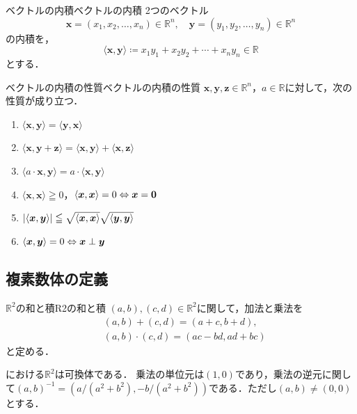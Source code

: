 \begin{definition}{ベクトルの内積}{ベクトルの内積}
  2つのベクトル
  \[
    \bm{x} = (x_1,x_2,\ldots,x_n) \in \mathbb{R}^n,\quad \bm{y} = (y_1,y_2,\ldots,y_n) \in \mathbb{R}^n
  \]
  の内積を，
  \[
    \langle \bm{x} , \bm{y} \rangle \coloneqq x_1y_1+x_2y_2+\dotsb+x_ny_n \in \mathbb{R}
  \]
  とする．
\end{definition}

\begin{theorem}{ベクトルの内積の性質}{ベクトルの内積の性質}
  $\bm{x},\bm{y},\bm{z} \in \mathbb{R}^n$，$a \in \mathbb{R}$に対して，次の性質が成り立つ．
  \begin{enumerate}
    \item $\langle \bm{x} , \bm{y} \rangle = \langle \bm{y} , \bm{x} \rangle$
    \item $\langle \bm{x} , \bm{y} + \bm{z} \rangle = \langle \bm{x} , \bm{y} \rangle + \langle \bm{x} , \bm{z} \rangle$
    \item $\langle a \cdot \bm{x} , \bm{y} \rangle = a \cdot \langle \bm{x} , \bm{y} \rangle$
    \item $\langle \bm{x} , \bm{x} \rangle \geqq 0$，$\langle \bm{x} , \bm{x} \rangle = 0 \mathrel{\Leftrightarrow} \bm{x} = \bm{0}$
    \item $\lvert\langle \bm{x} , \bm{y} \rangle\rvert \leqq \sqrt{\langle \bm{x} , \bm{x} \rangle} \sqrt{\langle \bm{y} , \bm{y} \rangle}$
    \item $\langle \bm{x} , \bm{y} \rangle = 0 \mathrel{\Leftrightarrow} \bm{x} \perp \bm{y}$
  \end{enumerate}
\end{theorem}
\subsection{複素数体の定義}

\begin{definition}{$\mathbb{R}^2$の和と積}{R2の和と積}
  $(a,b),(c,d) \in \mathbb{R}^2$に関して，加法と乗法を
  \begin{align*}
    & (a,b)+(c,d)=(a+c,b+d), \\
    & (a,b) \cdot (c,d) = (ac-bd,ad+bc)
  \end{align*}
  と定める．
\end{definition}

\begin{theorem}{}{}
  における$\mathbb{R}^2$は可換体である．
  乗法の単位元は$(1,0)$であり，乗法の逆元に関して$(a,b)^{-1}=(a/(a^2+b^2),-b/(a^2+b^2))$である．ただし$(a,b) \ne (0,0)$とする．
\end{theorem}

